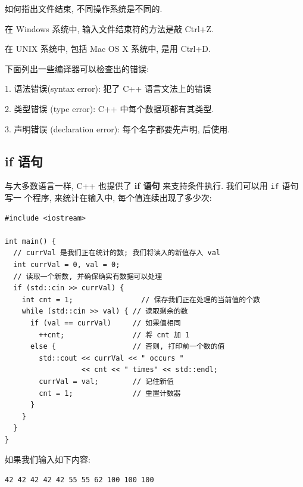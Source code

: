 \documentclass[lang=cn]{elegantbook}
\begin{document}
\vspace*{1\baselineskip}
\begin{note}[从键盘输入文件结束符]

如何指出文件结束, 不同操作系统是不同的.

在 Windows 系统中, 输入文件结束符的方法是敲 Ctrl+Z.

在 UNIX 系统中, 包括 Mac OS X 系统中, 是用 Ctrl+D.
\end{note}


\vspace*{1\baselineskip}
\begin{note}[常见错误]

下面列出一些编译器可以检查出的错误:

1. 语法错误(syntax error): 犯了 C++ 语言文法上的错误

2. 类型错误 (type error): C++ 中每个数据项都有其类型.

3. 声明错误 (declaration error): 每个名字都要先声明, 后使用.
\end{note}

\subsection{if 语句}
\label{sec:orgb2d79c1}

与大多数语言一样, C++ 也提供了 \textbf{if 语句} 来支持条件执行. 我们可以用 \texttt{if} 语句写一
个程序, 来统计在输入中, 每个值连续出现了多少次:

\begin{verbatim}
#include <iostream>

int main() {
  // currVal 是我们正在统计的数; 我们将读入的新值存入 val
  int currVal = 0, val = 0;
  // 读取一个新数, 并确保确实有数据可以处理
  if (std::cin >> currVal) {
    int cnt = 1;                // 保存我们正在处理的当前值的个数
    while (std::cin >> val) { // 读取剩余的数
      if (val == currVal)     // 如果值相同
        ++cnt;                // 将 cnt 加 1
      else {                  // 否则, 打印前一个数的值
        std::cout << currVal << " occurs "
                  << cnt << " times" << std::endl;
        currVal = val;        // 记住新值
        cnt = 1;              // 重置计数器
      }
    }
  }
}
\end{verbatim}

如果我们输入如下内容:

\begin{verbatim}
42 42 42 42 42 55 55 62 100 100 100
\end{verbatim}
\end{document}
